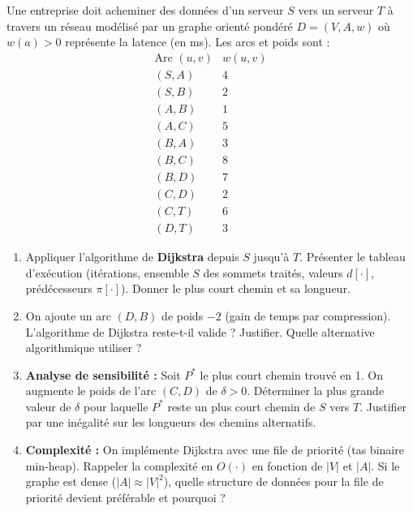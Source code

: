 \documentclass[11pt]{article}
\begin{document}
\begin{exercice}
Une entreprise doit acheminer des données d'un serveur $S$ vers un serveur $T$ à travers un réseau modélisé par un graphe orienté pondéré $D=(V,A,w)$ où $w(a) > 0$ représente la latence (en ms). Les arcs et poids sont :
\[
\begin{array}{c|c}
\text{Arc } (u,v) & w(u,v) \\ \hline
(S,A) & 4 \\
(S,B) & 2 \\
(A,B) & 1 \\
(A,C) & 5 \\
(B,A) & 3 \\
(B,C) & 8 \\
(B,D) & 7 \\
(C,D) & 2 \\
(C,T) & 6 \\
(D,T) & 3
\end{array}
\]
\begin{enumerate}
    \item Appliquer l'algorithme de \textbf{Dijkstra} depuis $S$ jusqu'à $T$. Présenter le tableau d'exécution (itérations, ensemble $S$ des sommets traités, valeurs $d[\cdot]$, prédécesseurs $\pi[\cdot]$). Donner le plus court chemin et sa longueur.
    \item On ajoute un arc $(D,B)$ de poids $-2$ (gain de temps par compression). L'algorithme de Dijkstra reste-t-il valide ? Justifier. Quelle alternative algorithmique utiliser ?
    \item \textbf{Analyse de sensibilité :} Soit $P^*$ le plus court chemin trouvé en 1. On augmente le poids de l'arc $(C,D)$ de $\delta > 0$. Déterminer la plus grande valeur de $\delta$ pour laquelle $P^*$ reste un plus court chemin de $S$ vers $T$. Justifier par une inégalité sur les longueurs des chemins alternatifs.
    \item \textbf{Complexité :} On implémente Dijkstra avec une file de priorité (tas binaire min-heap). Rappeler la complexité en $O(\cdot)$ en fonction de $|V|$ et $|A|$. Si le graphe est dense ($|A| \approx |V|^2$), quelle structure de données pour la file de priorité devient préférable et pourquoi ?
\end{enumerate}
\end{exercice}
\end{document}
